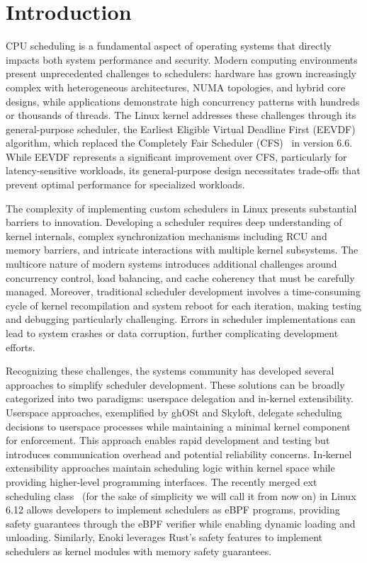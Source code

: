 
\section{Introduction}

CPU scheduling is a fundamental aspect of operating systems that directly impacts both system performance and security. Modern computing environments present unprecedented challenges to schedulers: hardware has grown increasingly complex with heterogeneous architectures, NUMA topologies, and hybrid core designs, while applications demonstrate high concurrency patterns with hundreds or thousands of threads\cite{hybridsched}. The Linux kernel addresses these challenges through its general-purpose scheduler, the Earliest Eligible Virtual Deadline First (EEVDF) algorithm\cite{eevdf}, which replaced the Completely Fair Scheduler (CFS)~\cite{cfs} in version 6.6. While EEVDF represents a significant improvement over CFS, particularly for latency-sensitive workloads, its general-purpose design necessitates trade-offs that prevent optimal performance for specialized workloads\cite{ghost,shenango}.

\parspace
The complexity of implementing custom schedulers in Linux presents substantial barriers to innovation. Developing a scheduler requires deep understanding of kernel internals, complex synchronization mechanisms including RCU and memory barriers, and intricate interactions with multiple kernel subsystems. The multicore nature of modern systems introduces additional challenges around concurrency control, load balancing, and cache coherency that must be carefully managed. Moreover, traditional scheduler development involves a time-consuming cycle of kernel recompilation and system reboot for each iteration, making testing and debugging particularly challenging. Errors in scheduler implementations can lead to system crashes or data corruption, further complicating development efforts.

\parspace
Recognizing these challenges, the systems community has developed several approaches to simplify scheduler development. These solutions can be broadly categorized into two paradigms: userspace delegation and in-kernel extensibility. Userspace approaches, exemplified by ghOSt\cite{ghost} and Skyloft\cite{skyloft}, delegate scheduling decisions to userspace processes while maintaining a minimal kernel component for enforcement. This approach enables rapid development and testing but introduces communication overhead and potential reliability concerns. In-kernel extensibility approaches maintain scheduling logic within kernel space while providing higher-level programming interfaces. The recently merged ext scheduling class~\cite{schedext} (for the sake of simplicity we will call it \ext  from now on) in Linux 6.12 allows developers to implement schedulers as eBPF\cite{ebpf} programs, providing safety guarantees through the eBPF verifier while enabling dynamic loading and unloading. Similarly, Enoki\cite{enoki} leverages Rust's safety features to implement schedulers as kernel modules with memory safety guarantees.


